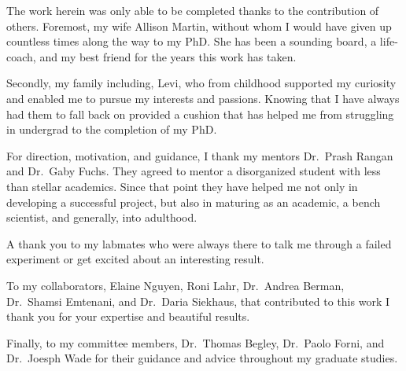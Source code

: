 \documentclass[12pt,oneside]{reedthesis}
\begin{document}
  \begin{acknowledgements}
  \pagestyle{plain}

    \par

    The work herein was only able to be completed thanks to the contribution of others. Foremost, my wife Allison Martin, without whom I would have given up countless times along the way to my PhD. She has been a sounding board, a life-coach, and my best friend for the years this work has taken.

    \par

    Secondly, my family including, Levi, who from childhood supported my curiosity and enabled me to pursue my interests and passions. Knowing that I have always had them to fall back on provided a cushion that has helped me from struggling in undergrad to the completion of my PhD.

    \par

    For direction, motivation, and guidance, I thank my mentors Dr.~Prash Rangan and Dr.~Gaby Fuchs. They agreed to mentor a disorganized student with less than stellar academics. Since that point they have helped me not only in developing a successful project, but also in maturing as an academic, a bench scientist, and generally, into adulthood.

    \par

    A thank you to my labmates who were always there to talk me through a failed experiment or get excited about an interesting result.

    \par

    To my collaborators, Elaine Nguyen, Roni Lahr, Dr.~Andrea Berman, Dr.~Shamsi Emtenani, and Dr.~Daria Siekhaus, that contributed to this work I thank you for your expertise and beautiful results.

    \par

    Finally, to my committee members, Dr.~Thomas Begley, Dr.~Paolo Forni, and Dr.~Joesph Wade for their guidance and advice throughout my graduate studies.
  \end{acknowledgements}
\end{document}
